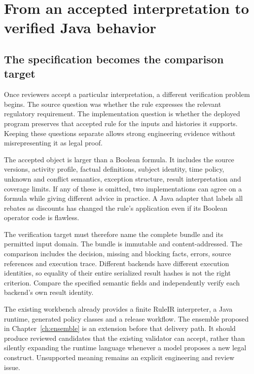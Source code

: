 \chapter{From an accepted interpretation to verified Java behavior}
\label{ch:verification}

\section{The specification becomes the comparison target}
\label{merge:M07:00}


Once reviewers accept a particular interpretation, a different verification
problem begins. The source question was whether the rule expresses the relevant
regulatory requirement. The implementation question is whether the deployed
program preserves that accepted rule for the inputs and histories it supports.
Keeping these questions separate allows strong engineering evidence without
misrepresenting it as legal proof.

The accepted object is larger than a Boolean formula. It includes the source
versions, activity profile, factual definitions, subject identity, time policy,
unknown and conflict semantics, exception structure, result interpretation and
coverage limits. If any of these is omitted, two implementations can agree on a
formula while giving different advice in practice. A Java adapter that labels
all rebates as discounts has changed the rule's application even if its Boolean
operator code is flawless.


The verification target must therefore name the complete bundle and its
permitted input domain. The bundle is immutable and content-addressed. The
comparison includes the decision, missing and blocking facts, errors, source
references and execution trace. Different backends have different execution
identities, so equality of their entire serialized result hashes is not the
right criterion. Compare the specified semantic fields and independently verify
each backend's own result identity.

The existing workbench already provides a finite RuleIR interpreter, a Java
runtime, generated policy classes and a release workflow. The ensemble proposed
in Chapter~\ref{ch:ensemble} is an extension before that delivery path. It should
produce reviewed candidates that the existing validator can accept, rather than
silently expanding the runtime language whenever a model proposes a new legal
construct. Unsupported meaning remains an explicit engineering and review issue.

